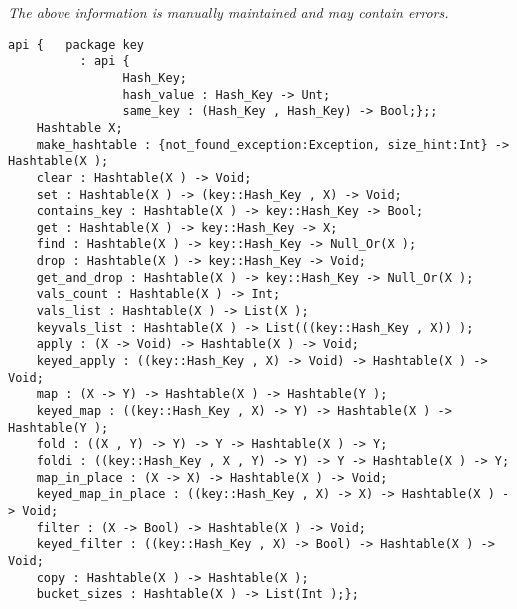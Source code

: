 \label{api:Typelocked\_Hashtable}

{\tiny \it The above information is manually maintained and may contain errors.}
\begin{verbatim}
api {   package key
          : api {
                Hash_Key;
                hash_value : Hash_Key -> Unt;
                same_key : (Hash_Key , Hash_Key) -> Bool;};;
    Hashtable X;
    make_hashtable : {not_found_exception:Exception, size_hint:Int} -> Hashtable(X );
    clear : Hashtable(X ) -> Void;
    set : Hashtable(X ) -> (key::Hash_Key , X) -> Void;
    contains_key : Hashtable(X ) -> key::Hash_Key -> Bool;
    get : Hashtable(X ) -> key::Hash_Key -> X;
    find : Hashtable(X ) -> key::Hash_Key -> Null_Or(X );
    drop : Hashtable(X ) -> key::Hash_Key -> Void;
    get_and_drop : Hashtable(X ) -> key::Hash_Key -> Null_Or(X );
    vals_count : Hashtable(X ) -> Int;
    vals_list : Hashtable(X ) -> List(X );
    keyvals_list : Hashtable(X ) -> List(((key::Hash_Key , X)) );
    apply : (X -> Void) -> Hashtable(X ) -> Void;
    keyed_apply : ((key::Hash_Key , X) -> Void) -> Hashtable(X ) -> Void;
    map : (X -> Y) -> Hashtable(X ) -> Hashtable(Y );
    keyed_map : ((key::Hash_Key , X) -> Y) -> Hashtable(X ) -> Hashtable(Y );
    fold : ((X , Y) -> Y) -> Y -> Hashtable(X ) -> Y;
    foldi : ((key::Hash_Key , X , Y) -> Y) -> Y -> Hashtable(X ) -> Y;
    map_in_place : (X -> X) -> Hashtable(X ) -> Void;
    keyed_map_in_place : ((key::Hash_Key , X) -> X) -> Hashtable(X ) -> Void;
    filter : (X -> Bool) -> Hashtable(X ) -> Void;
    keyed_filter : ((key::Hash_Key , X) -> Bool) -> Hashtable(X ) -> Void;
    copy : Hashtable(X ) -> Hashtable(X );
    bucket_sizes : Hashtable(X ) -> List(Int );};
\end{verbatim}
